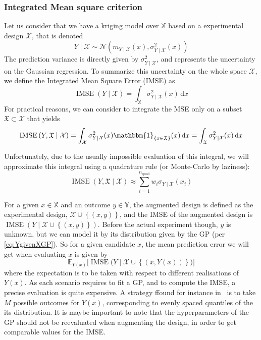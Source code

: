 \documentclass[a4paper,11pt]{article}
\newcommand{\Ex}{\mathbb{E}}
\newcommand{\Xspace}{\mathbb{X}}
\newcommand{\Yspace}{\mathbb{Y}}
\DeclareMathOperator{\IMSE}{IMSE}
\theoremstyle{defi}
\numberwithin{thmCounter}{section}
\begin{document}
\subsubsection{Integrated Mean square criterion}
\cite{sacks_designs_1989}
Let us consider that we have a kriging model over $\Xspace$ based on a experimental design $\mathcal{X}$, that is denoted
\begin{equation}
  \label{eq:YgivenXGP}
  Y\mid \mathcal{X} \sim \mathcal{N}(m_{Y\mid\mathcal{X}}(x),\sigma^2_{Y\mid\mathcal{X}}(x))
\end{equation}
The prediction variance is directly given by $\sigma^2_{Y\mid \mathcal{X}}$, and represents the uncertainty on the Gaussian regression. To summarize this uncertainty on the whole space $\mathcal{X}$, we define the Integrated Mean Square Error (IMSE) as
\begin{equation}
  \IMSE(Y \mid \mathcal{X}) = \int_{\Xspace} \sigma_{Y\mid\mathcal{X}}^2(x)\,\mathrm{d}x
\end{equation}
For practical reasons, we can consider to integrate the MSE only on a subset $\mathfrak{X}\subset \mathcal{X}$ that yields
\begin{equation}
  \IMSE\left(Y,\mathfrak{X} \mid \mathcal{X} \right) = \int_{\mathcal{X}} \sigma^2_{Y\mid \mathcal{X}}(x)  \mathbbm{1}_{\{x \in \mathfrak{X}\}}(x)\,\mathrm{d}x = \int_{\mathfrak{X}} \sigma^2_{Y\mid \mathcal{X}}(x)\,\mathrm{d}x
\end{equation}

Unfortunately, due to the usually impossible evaluation of this integral, we will approximate this integral using a quadrature rule (or Monte-Carlo by laziness):
\begin{equation}
  \IMSE(Y,\mathfrak{X} \mid \mathcal{X}) \approx \sum_{i=1}^{n_{\mathrm{quad}}} w_i \sigma_{Y\mid\mathcal{X}}(x_i)
\end{equation}

For a given $x\in \Xspace$ and an outcome $y\in\Yspace$, the augmented design is defined as the experimental design, $\mathcal{X} \cup \left\{(x, y)\right\}$, and the IMSE of the augmented design is $\IMSE\left(Y \mid \mathcal{X} \cup \left\{(x, y)\right\} \right)$. Before the actual experiment though, $y$ is unknown, but we can model it by its distribution given by the GP (per \eqref{eq:YgivenXGP}). So for a given candidate $x$, the mean prediction error we will get when evaluating $x$ is given by
\begin{equation}
  \label{eq:IMSE_augmented}
  \Ex_{Y(x)}\Big[\IMSE\big(Y \mid \mathcal{X} \cup \left\{(x, Y(x))\right\} \big)\Big]
\end{equation}
where the expectation is to be taken with respect to different realisations of $Y(x)$. As each scenario requires to fit a GP, and to compute the IMSE, a precise evaluation is quite expensive. A strategy ffound for instance in~\cite{villemonteix_informational_2006} is to take $M$ possible outcomes for $Y(x)$, corresponding to evenly spaced quantiles of the its distribution.
It is maybe important to note that the hyperparameters of the GP should not be reevaluated when augmenting the design, in order to get comparable values for the IMSE.
\end{document}
